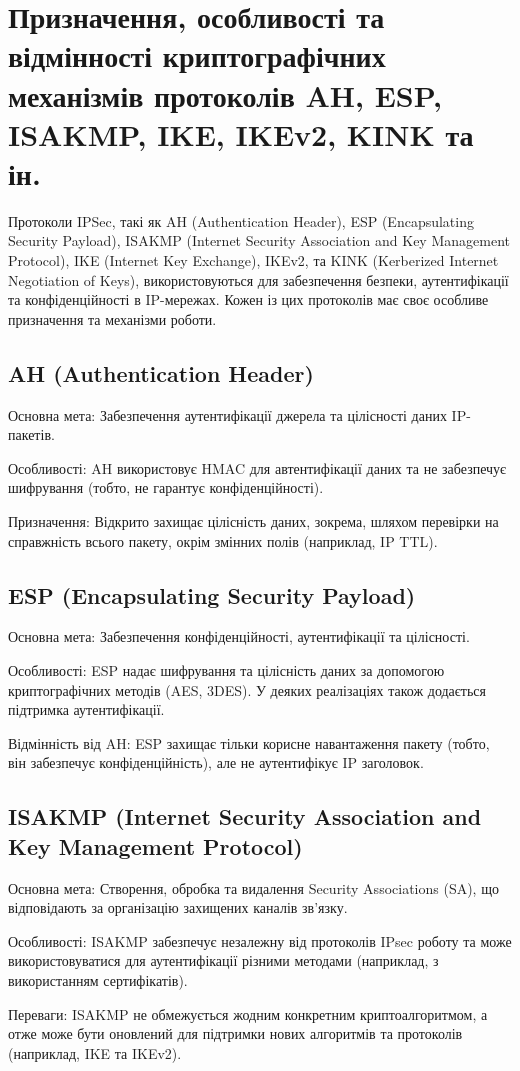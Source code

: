 \section{Призначення, особливості та відмінності криптографічних механізмів протоколів AH, ESP, ISAKMP, IKE, IKEv2, KINK та ін.}

Протоколи IPSec, такі як AH (Authentication Header), ESP (Encapsulating Security Payload), ISAKMP (Internet Security Association and Key Management Protocol), IKE (Internet Key Exchange), IKEv2, та KINK (Kerberized Internet Negotiation of Keys), використовуються для забезпечення безпеки, аутентифікації та конфіденційності в IP-мережах. Кожен із цих протоколів має своє особливе призначення та механізми роботи.

\subsection{AH (Authentication Header)}
Основна мета: Забезпечення аутентифікації джерела та цілісності даних IP-пакетів.
\par Особливості: AH використовує HMAC для автентифікації даних та не забезпечує шифрування (тобто, не гарантує конфіденційності).
\par Призначення: Відкрито захищає цілісність даних, зокрема, шляхом перевірки на справжність всього пакету, окрім змінних полів (наприклад, IP TTL).

\subsection{ESP (Encapsulating Security Payload)}
Основна мета: Забезпечення конфіденційності, аутентифікації та цілісності.
\par Особливості: ESP надає шифрування та цілісність даних за допомогою криптографічних методів (AES, 3DES). У деяких реалізаціях також додається підтримка аутентифікації.
\par Відмінність від AH: ESP захищає тільки корисне навантаження пакету (тобто, він забезпечує конфіденційність), але не аутентифікує IP заголовок.

\subsection{ISAKMP (Internet Security Association and Key Management Protocol)}
Основна мета: Створення, обробка та видалення Security Associations (SA), що відповідають за організацію захищених каналів зв’язку.
\par Особливості: ISAKMP забезпечує незалежну від протоколів IPsec роботу та може використовуватися для аутентифікації різними методами (наприклад, з використанням сертифікатів).
\par Переваги: ISAKMP не обмежується жодним конкретним криптоалгоритмом, а отже може бути оновлений для підтримки нових алгоритмів та протоколів (наприклад, IKE та IKEv2).


